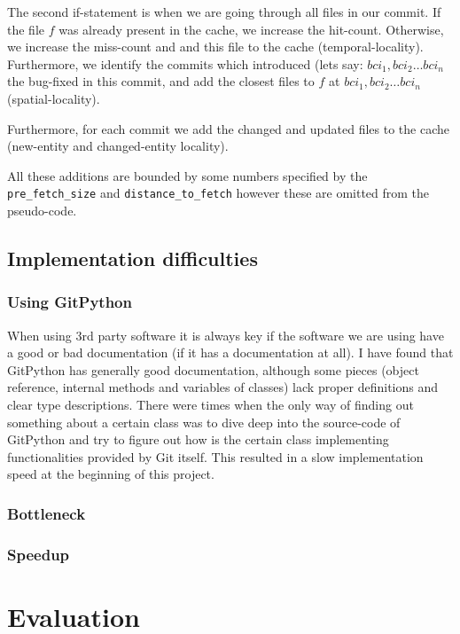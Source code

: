 \documentclass[12pt,twoside,notitlepage]{report}
\begin{document}
The second if-statement is when we are going through all files in our commit. If the file $f$ was already present in the cache, we increase the hit-count. Otherwise, we increase the miss-count and and this file to the cache (temporal-locality). Furthermore, we identify the commits which introduced (lets say: $bci_1, bci_2 \dots bci_n$ the bug-fixed in this commit, and add the closest files to $f$ at $bci_1, bci_2 \dots bci_n$ (spatial-locality).

Furthermore, for each commit we add the changed and updated files to the cache (new-entity and changed-entity locality). 

All these additions are bounded by some numbers specified by the \texttt{pre\_fetch\_size} and \texttt{distance\_to\_fetch} however these are omitted from the pseudo-code.
\section{Implementation difficulties}
\subsection{Using GitPython}
When using 3rd party software it is always key if the software we are using have a good or bad documentation (if it has a documentation at all). I have found that GitPython has generally good documentation, although some pieces (object reference, internal methods and variables of classes) lack proper definitions and clear type descriptions. There were times when the only way of finding out something about a certain class was to dive deep into the source-code of GitPython and try to figure out how is the certain class implementing functionalities provided by Git itself. This resulted in a slow implementation speed at the beginning of this project.
\subsection{Bottleneck}
\subsection{Speedup}
\chapter{Evaluation}

\end{document}

